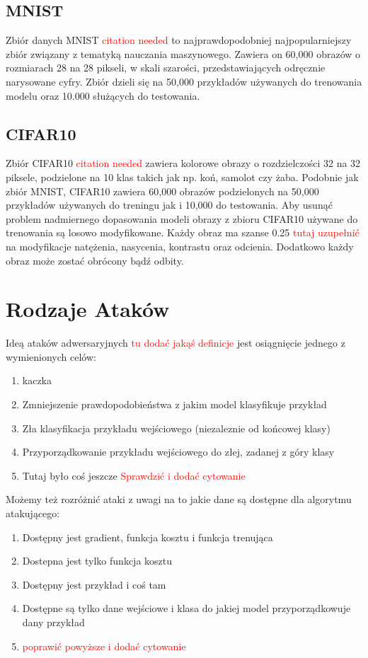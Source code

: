 \documentclass{article}
\newcommand\todo[1]{\textcolor{red}{#1}}
\begin{document}
    \subsection{MNIST}
    Zbiór danych MNIST \todo{citation needed} to najprawdopodobniej najpopularniejszy zbiór związany z
    tematyką nauczania maszynowego.
    Zawiera on 60,000 obrazów o rozmiarach 28 na 28 pikseli, w skali szarości, przedstawiających
    odręcznie narysowane cyfry. Zbiór dzieli się na 50,000 przykładów używanych do
    trenowania modelu oraz 10.000 służących do testowania.

    \subsection{CIFAR10}
    Zbiór CIFAR10 \todo{citation needed} zawiera kolorowe obrazy o rozdzielczości 32 na 32 piksele,
    podzielone na 10 klas takich jak np. koń, samolot czy żaba. Podobnie jak zbiór MNIST, CIFAR10 zawiera
    60,000 obrazów podzielonych na 50,000 przykładów używanych do treningu jak i 10,000 do testowania.
    Aby usunąć problem nadmiernego dopasowania modeli obrazy z zbioru CIFAR10 używane
    do trenowania są losowo modyfikowane. Każdy obraz ma szanse 0.25 \todo{tutaj uzupełnić} na
    modyfikacje natężenia, nasycenia, kontrastu oraz odcienia. Dodatkowo każdy obraz może zostać obrócony bądź odbity.




\section{Rodzaje Ataków}
Ideą ataków adwersaryjnych \todo{tu dodać jakąś definicje} jest osiągnięcie jednego z wymienionych celów:
\begin{enumerate}
    \item kaczka
    \item Zmniejszenie prawdopodobieństwa z jakim model klasyfikuje przykład
    \item Zła klasyfikacja przykładu wejściowego (niezaleznie od końcowej klasy)
    \item Przyporządkowanie przykładu wejściowego do złej, zadanej z góry klasy
    \item Tutaj było coś jeszcze \todo{Sprawdzić i dodać cytowanie}
\end{enumerate}

Możemy też rozróżnić ataki z uwagi na to jakie dane są dostępne dla algorytmu atakującego:
\begin{enumerate}
    \item Dostępny jest gradient, funkcja kosztu i funkcja trenująca
    \item Dostepna jest tylko funkcja kosztu
    \item Dostępny jest przykład i coś tam
    \item Dostępne są tylko dane wejściowe i klasa do jakiej model przyporządkowuje dany przykład
    \item \todo{poprawić powyższe i dodać cytowanie}
\end{enumerate}
\end{document}
